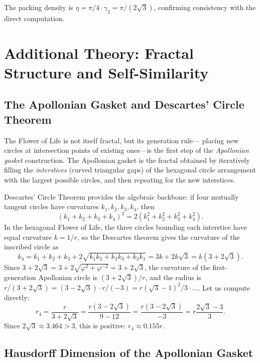 The packing density is \(\eta = \pi/4 \cdot \gamma_2 = \pi/(2\sqrt{3})\),
confirming consistency with the direct computation.

\section{Additional Theory: Fractal Structure and Self-Similarity}
\label{sec:fol-fractal}

\subsection{The Apollonian Gasket and Descartes' Circle Theorem}
\label{subsec:fol-apollonian}

The Flower of Life is not itself fractal, but its generation rule—
placing new circles at intersection points of existing ones—is the
first step of the \emph{Apollonian gasket} construction.  The
Apollonian gasket is the fractal obtained by iteratively filling the
\emph{interstices} (curved triangular gaps) of the hexagonal circle
arrangement with the largest possible circles, and then repeating
for the new interstices.

Descartes' Circle Theorem provides the algebraic backbone: if four
mutually tangent circles have curvatures \(k_1,k_2,k_3,k_4\), then
\[
  (k_1+k_2+k_3+k_4)^2 = 2(k_1^2+k_2^2+k_3^2+k_4^2).
\]
In the hexagonal Flower of Life, the three circles bounding each
interstice have equal curvature \(k=1/r\), so the Descartes theorem
gives the curvature of the inscribed circle as
\[
  k_4 = k_1+k_2+k_3+2\sqrt{k_1 k_2+k_2 k_3+k_3 k_1}
       = 3k + 2k\sqrt{3}
       = k(3+2\sqrt{3}).
\]
Since \(3+2\sqrt{3}=3+2\sqrt{\varphi^2+\varphi^{-2}}=3+2\sqrt{3}\),
the curvature of the first-generation Apollonian circle is
\((3+2\sqrt{3})/r\), and the radius is \(r/(3+2\sqrt{3})=(3-2\sqrt{3})\cdot r/(-3)
= r(\sqrt{3}-1)^2/3\cdot\ldots\).  Let us compute directly:
\[
  r_4 = \frac{r}{3+2\sqrt{3}} = \frac{r(3-2\sqrt{3})}{9-12} = \frac{r(3-2\sqrt{3})}{-3} = r\frac{2\sqrt{3}-3}{3}.
\]
Since \(2\sqrt{3}\approx 3.464>3\), this is positive: \(r_4 \approx 0.155r\).

\subsection{Hausdorff Dimension of the Apollonian Gasket}
\label{subsec:fol-hausdorff}

